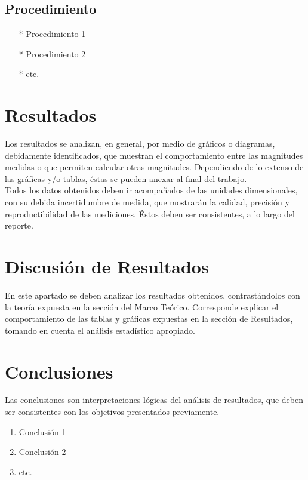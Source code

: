 \documentclass[osajnl,twocolumn,showpacs,superscriptaddress,10pt]{revtex4-1}
\begin{document}
\subsection{Procedimiento}
\begin{enumerate}
\item[*] Procedimiento 1
\item[*] Procedimiento 2
\item[*] etc.
\end{enumerate}

\section{Resultados}

Los resultados se analizan, en general, por medio de gráficos o diagramas,
debidamente identificados, que muestran el comportamiento entre las magnitudes
medidas o que permiten calcular otras magnitudes. Dependiendo de lo extenso de las
gráficas y/o tablas, éstas se pueden anexar al final del trabajo.\\

Todos los datos obtenidos deben ir acompañados de las unidades dimensionales,
con su debida incertidumbre de medida, que mostrarán la calidad, precisión y
reproductibilidad de las mediciones. Éstos deben ser consistentes, a lo largo del
reporte.\\


\section{Discusión de Resultados}

En este apartado se deben analizar los resultados obtenidos, contrastándolos con
la teoría expuesta en la sección del Marco Teórico. Corresponde explicar el
comportamiento de las tablas y gráficas expuestas en la sección de Resultados,
tomando en cuenta el análisis estadístico apropiado.\\

\section{Conclusiones}

Las conclusiones son interpretaciones lógicas del análisis de resultados, que
deben ser consistentes con los objetivos presentados previamente.\\

\begin{enumerate}
\item Conclusión 1
\item Conclusión 2
\item etc.
\end{enumerate}
\end{document}
